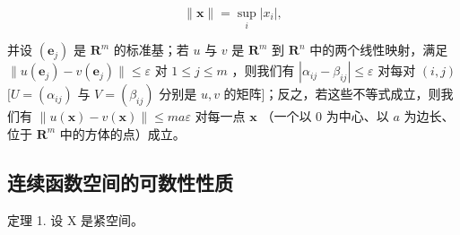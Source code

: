 \[
\| \boldsymbol {x} \| = \sup _ {i} | x _ {i} |,
\]

并设 \((\pmb{e}_j)\) 是 \(\mathbf{R}^m\) 的标准基；若 \(u\) 与 \(v\) 是 \(\mathbf{R}^m\) 到 \(\mathbf{R}^n\) 中的两个线性映射，满足 \(\| u(\pmb{e}_j) - v(\pmb{e}_j)\| \leqslant \varepsilon\) 对 \(1 \leqslant j \leqslant m\) ，则我们有 \(|\alpha_{ij} - \beta_{ij}| \leqslant \varepsilon\) 对每对 \((i,j)\) \([U = (\alpha_{ij})\) 与 \(V = (\beta_{ij})\) 分别是 \(u, v\) 的矩阵{]}；反之，若这些不等式成立，则我们有 \(\| u(\pmb{x}) - v(\pmb{x})\| \leqslant ma\varepsilon\) 对每一点 \(\pmb{x}\) （一个以 0 为中心、以 \(a\) 为边长、位于 \(\mathbf{R}^m\) 中的方体的点）成立。

\subsection{连续函数空间的可数性性质}

定理 1. 设 X 是紧空间。

